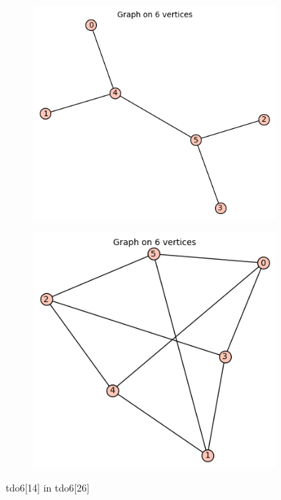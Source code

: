 \documentclass[12pt, a4paper]{article}
\begin{document}
\begin{center}
\begin{figure}[!htb]
\centering
\begin{subfigure}{0.5\textwidth}
  \centering
  \includegraphics[width=0.6\linewidth]{tdo6[14]}
\end{subfigure}%
\begin{subfigure}{0.5\textwidth}
  \centering
  \includegraphics[width=0.5\linewidth]{tdo6[26]}
\end{subfigure}
\caption{tdo6[14] in tdo6[26]}
\label{fig:test}
\end{figure}


\end{center}
\end{document}
